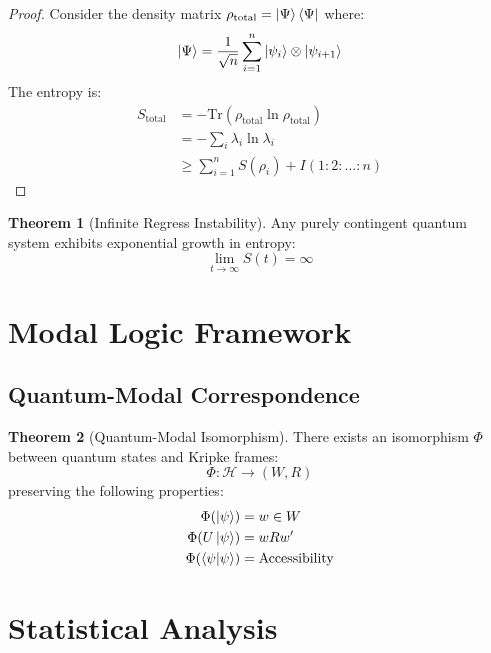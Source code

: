 \documentclass[12pt]{article}
\theoremstyle{definition}
\newtheorem{theorem}{Theorem}[section]
\begin{document}
\begin{proof}
Consider the density matrix $\rho_{\text{total}} = \ket{\Psi}\bra{\Psi}$ where:
\begin{equation}
    \ket{\Psi} = \frac{1}{\sqrt{n}}\sum_{i=1}^n \ket{\psi_i}\otimes\ket{\psi_{i+1}}
\end{equation}
The entropy is:
\begin{align}
    S_{\text{total}} &= -\text{Tr}(\rho_{\text{total}}\ln\rho_{\text{total}}) \\
    &= -\sum_i \lambda_i\ln\lambda_i \\
    &\geq \sum_{i=1}^n S(\rho_i) + I(1:2:...:n)
\end{align}
\end{proof}

\begin{theorem}[Infinite Regress Instability]
Any purely contingent quantum system exhibits exponential growth in entropy:
\begin{equation}
    \lim_{t\to\infty} S(t) = \infty
\end{equation}
\end{theorem}

\section{Modal Logic Framework}

\subsection{Quantum-Modal Correspondence}

\begin{theorem}[Quantum-Modal Isomorphism]
There exists an isomorphism $\Phi$ between quantum states and Kripke frames:
\begin{equation}
    \Phi: \mathcal{H} \to (W, R)
\end{equation}
preserving the following properties:
\begin{align}
    \Phi(\ket{\psi}) &= w \in W \\
    \Phi(U\ket{\psi}) &= wRw' \\
    \Phi(\braket{\psi|\psi}) &= \text{Accessibility}
\end{align}
\end{theorem}

\section{Statistical Analysis}
\end{document}
